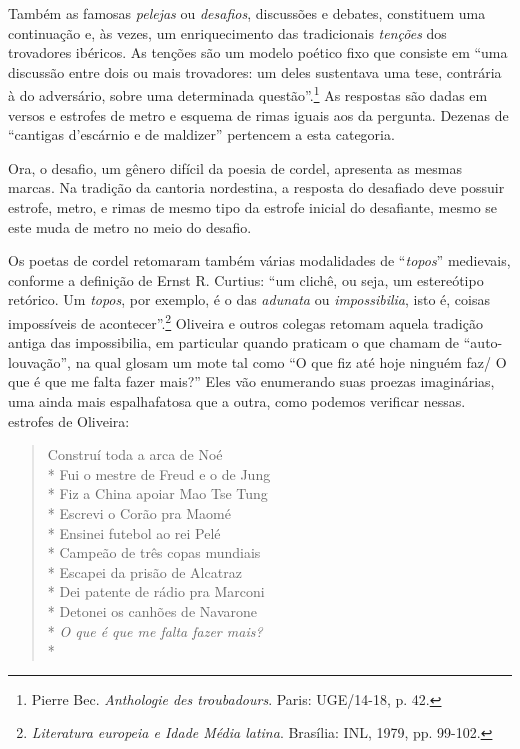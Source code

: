\asterisc

Também as famosas \textit{pelejas} ou \textit{desafios}, discussões e
debates, constituem uma continuação e, às vezes, um
enriquecimento das tradicionais \textit{tenções} dos trovadores
ibéricos. As tenções são um modelo poético fixo que consiste
em ``uma discussão entre dois ou mais trovadores: um deles
sustentava uma tese, contrária à do adversário, sobre uma
determinada questão''.\footnote{ Pierre Bec. \textit{Anthologie des
troubadours}. Paris: UGE/14-18, p. 42.} As respostas são dadas em versos
e estrofes de metro e esquema de rimas iguais aos da
pergunta. Dezenas de ``cantigas d'escárnio
e de maldizer'' pertencem a esta categoria.

Ora, o desafio, um gênero difícil da poesia de cordel,
apresenta as mesmas marcas. Na tradição da cantoria
nordestina, a resposta do desafiado deve possuir estrofe,
metro, e rimas de mesmo tipo da estrofe inicial do desafiante,
mesmo se este muda de metro no meio do desafio.

Os poetas de cordel retomaram também várias
modalidades de ``\textit{topos}'' medievais, conforme a
definição de Ernst R. Curtius: ``um clichê, ou seja, um estereótipo
retórico. Um \textit{topos}, por exemplo, é o das \textit{adunata} ou
\textit{impossibilia}, isto é, coisas impossíveis de
acontecer''.\footnote{ \textit{Literatura europeia e Idade Média
latina}. Brasília: INL, 1979, pp. 99-102.}
Oliveira e outros colegas retomam aquela tradição antiga
das impossibilia, em particular quando praticam o que
chamam de ``auto-louvação'', na qual glosam um
mote tal como ``O que fiz até hoje ninguém faz/ O que é que me
falta fazer mais?'' Eles vão enumerando suas proezas
imaginárias, uma ainda mais espalhafatosa que a outra,
como podemos verificar nessas. estrofes de Oliveira:

\begin{verse}

Construí toda a arca de Noé\\*
Fui o mestre de Freud e o de Jung\\*
Fiz a China apoiar Mao Tse Tung\\*
Escrevi o Corão pra Maomé\\*
Ensinei futebol ao rei Pelé\\*
Campeão de três copas mundiais\\*
Escapei da prisão de Alcatraz\\*
Dei patente de rádio pra Marconi\\*
Detonei os canhões de Navarone\\*
\textit{O que é que me falta fazer mais?}\\*

\end{verse}

